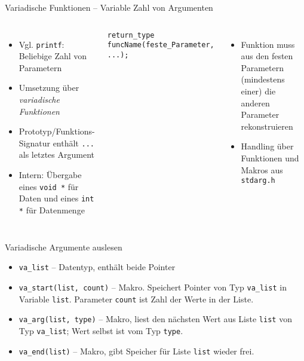 \begin{frame}[fragile]{Variadische Funktionen -- Variable Zahl von Argumenten}
%
\begin{columns}[T]
\begin{itemize}
\item Vgl. \texttt{printf}: Beliebige Zahl von Parametern
\item Umsetzung über \emph{variadische Funktionen}
\item Prototyp/Funktions-Signatur enthält \texttt{...} als letztes Argument
\item Intern: Übergabe eines \texttt{void *} für Daten und eines \texttt{int *} für Datenmenge
\end{itemize}
%
\begin{codebox}
\begin{verbatim}
return_type funcName(feste_Parameter, ...);
\end{verbatim}
%
\end{codebox}
\begin{itemize}
\item Funktion muss aus den festen Parametern (mindestens einer) die anderen Parameter rekonstruieren
\item Handling über Funktionen und Makros aus \texttt{stdarg.h}
\end{itemize}
\end{columns}
%
\end{frame}


\begin{frame}{Variadische Argumente auslesen}
%
\begin{itemize}
\item \texttt{va\_list} -- Datentyp, enthält beide Pointer
\item \texttt{va\_start(list, count)} -- Makro. Speichert Pointer von Typ \texttt{va\_list} in Variable \texttt{list}. Parameter \texttt{count} ist Zahl der Werte in der Liste.
\item \texttt{va\_arg(list, type)}  -- Makro, liest den nächsten Wert aus Liste \texttt{list} von Typ \texttt{va\_list}; Wert selbst ist vom Typ \texttt{type}.
\item \texttt{va\_end(list)} -- Makro, gibt Speicher für Liste \texttt{list} wieder frei.
\end{itemize}
%
\end{frame}

